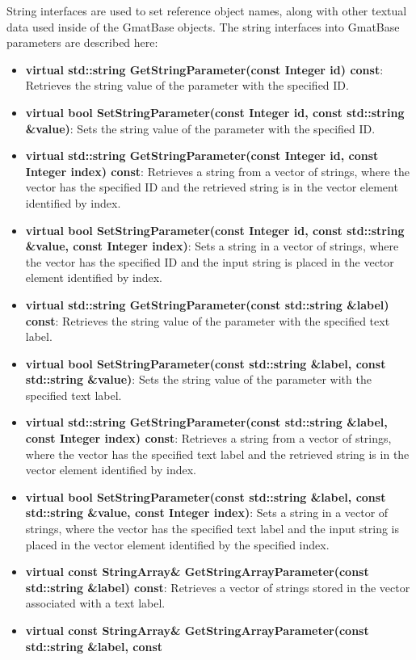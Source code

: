 String interfaces are used to set reference object names, along with other textual data used inside
of the GmatBase objects.  The string interfaces into GmatBase parameters are described here:

\begin{itemize}
\item \textbf{virtual std::string GetStringParameter(const Integer id) const}: Retrieves the
string value of the parameter with the specified ID.
\item \textbf{virtual bool SetStringParameter(const Integer id, const std::string \&value)}:
Sets the string value of the parameter with the specified ID.
\item \textbf{virtual std::string GetStringParameter(const Integer id, const Integer index)
const}: Retrieves a string from a vector of strings, where the vector has the specified ID and the
retrieved string is in the vector element identified by index.
\item \textbf{virtual bool SetStringParameter(const Integer id, const std::string \&value, const
Integer index)}: Sets a string in a vector of strings, where the vector has the specified ID
and the input string is placed in the vector element identified by index.
\item \textbf{virtual std::string GetStringParameter(const std::string \&label) const}: Retrieves
the string value of the parameter with the specified text label.
\item \textbf{virtual bool SetStringParameter(const std::string \&label, const std::string
\&value)}: Sets the string value of the parameter with the specified text label.
\item \textbf{virtual std::string GetStringParameter(const std::string \&label, const Integer
index) const}: Retrieves a string from a vector of strings, where the vector has the specified text
label and the retrieved string is in the vector element identified by index.
\item \textbf{virtual bool SetStringParameter(const std::string \&label, const std::string
\&value, const Integer index)}: Sets a string in a vector of strings, where the vector has the
specified text label and the input string is placed in the vector element identified by the
specified index.
\item \textbf{virtual const StringArray\& GetStringArrayParameter(const std::string \&label)
const}: Retrieves a vector of strings stored in the vector associated with a text label.
\item \textbf{virtual const StringArray\& GetStringArrayParameter(const std::string \&label, const
}
\end{itemize}
